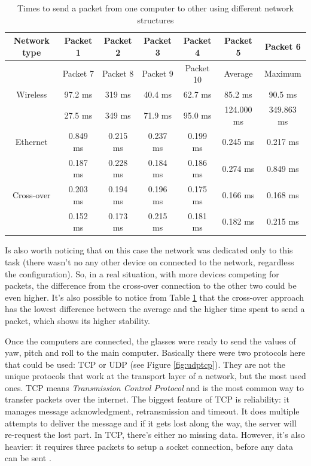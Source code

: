 \documentclass[msc, a4paper, classic, en]{ufbathesis}
\begin{document}
\begin{table}
\caption{Times to send a packet from one computer to other using different network structures}
\label{tab:ping}
\centering
\begin{tabular}{|c|c|c|c|c|c|c|}
\hline
Network type & Packet 1 & Packet 2 & Packet 3 & Packet 4 & Packet 5 & Packet 6 \\
\hline
             & Packet 7 & Packet 8 & Packet 9 & Packet 10 & Average & Maximum \\ 
\hline
Wireless & 97.2 ms & 319 ms & 40.4 ms & 62.7 ms & 85.2 ms & 90.5 ms \\
\hline
         & 27.5 ms & 349 ms & 71.9 ms & 95.0 ms & 124.000 ms & 349.863 ms \\
\hline
Ethernet & 0.849 ms & 0.215 ms & 0.237 ms & 0.199 ms & 0.245 ms & 0.217 ms \\
\hline
         & 0.187 ms & 0.228 ms & 0.184 ms & 0.186 ms & 0.274 ms & 0.849 ms \\
\hline
Cross-over & 0.203 ms & 0.194 ms & 0.196 ms & 0.175 ms & 0.166 ms & 0.168 ms \\
\hline
           & 0.152 ms & 0.173 ms & 0.215 ms & 0.181 ms & 0.182 ms & 0.215 ms \\
\hline
\end{tabular}
\end{table}

Is also worth noticing that on this case the network was dedicated only to this task (there wasn't no any other device on connected to the network, regardless the configuration). So, in a real situation, with more devices competing for packets, the difference from the cross-over connection to the other two could be even higher. It's also possible to notice from Table \ref{tab:ping} that the cross-over approach has the lowest difference between the average and the higher time spent to send a packet, which shows its higher stability.

Once the computers are connected, the glasses were ready to send the values of yaw, pitch and roll to the main computer. Basically there were two protocols here that could be used: TCP or UDP (see Figure \ref{fig:udptcp}). They are not the unique protocols that work at the transport layer of a network, but the most used ones. TCP means \textit{Transmission Control Protocol} and is the most common way to transfer packets over the internet. The biggest feature of TCP is reliability: it manages message acknowledgment, retransmission and timeout. It does multiple attempts to deliver the message and if it gets lost along the way, the server will re-request the lost part. In TCP, there's either no missing data. However, it's also heavier: it requires three packets to setup a socket connection, before any data can be sent \cite{udp}.
\end{document}
